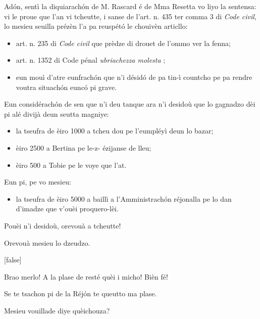 \begin{drama}
\DzeudzoSenliquerspeaks Adón, sentì la diquiarachón de M. Rascard é de Mma Resetta vo liyo la sentensa: vi le proue que l’an vi tcheutte, i sanse de l’art. n. 435 ter comma 3 di \textit{Code civil}, lo mesieu seuilla prézèn l’a pa reuspétó le chouivèn articllo:
\begin{itemize}
\item[$\bullet$] art. n. 235 di \textit{Code civil} que prèdze di drouet de l’ommo ver la fenna;
\item[$\bullet$] art. n. 1352 di Code pénal \textit{ubriachezza molesta} \pionn;
\item[$\bullet$] eun mouì d’atre eunfrachón que n’i désidó de pa tin-ì coun\-tcho pe pa rendre voutra situachón eunc\'o pi grave.
\end{itemize}
Eun considérachón de sen que n’i deu tanque ara n'i desidoù que lo gagnadzo dèi pi alé divijà deun seutta magniye:
\begin{itemize}
\item[$\bullet$] la tseufra de èiro 1000 a tcheu dou pe l'eumpléyì deun lo bazar;
\item[$\bullet$] èiro 2500 a Bertina pe le-z- ézijanse de lleu;
\item[$\bullet$] èiro 500 a Tobie pe le voye que l'at.
\end{itemize}
Eun pi, pe vo mesieu:
\begin{itemize}
\item[$\bullet$]  la tseufra de èiro 5000 a baillì a l’Amministrachón réjonalla pe lo dan d’imadze que v'ouèi proquero-lèi.
\end{itemize}
Pouèi n'i desidoù, orevouà a tcheutte!

\tcheuttespeaks Orevouà mesieu lo dzeudzo.

[false]




\Eumprezeospeaks Brao merlo! A la plase de resté quèi i micho!  Bièn fé!

\Simonspeaks {} Se te tsachon pi de la Réjón te queutto ma plase.


\Ritaspeaks {} Mesieu vouillade diye quèichouza?


\end{drama}
